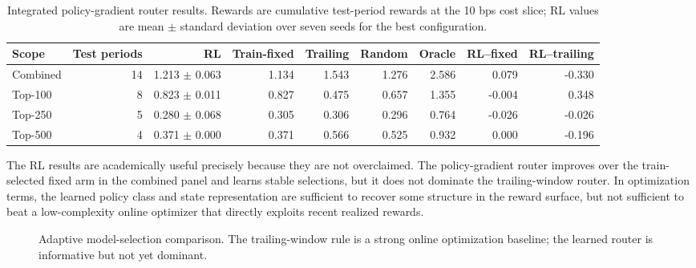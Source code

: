\documentclass[11pt,a4paper]{article}
\begin{document}
\begin{table}[H]
\centering
\caption{Integrated policy-gradient router results. Rewards are cumulative test-period rewards at the 10 bps cost slice; RL values are mean $\pm$ standard deviation over seven seeds for the best configuration.}
\label{tab:rl_math}
\scriptsize
\begin{tabular}{lrrrrrrrr}
\toprule
Scope & Test periods & RL & Train-fixed & Trailing & Random & Oracle & RL--fixed & RL--trailing\\
\midrule
Combined & 14 & 1.213 $\pm$ 0.063 & 1.134 & 1.543 & 1.276 & 2.586 & 0.079 & -0.330\\
Top-100 & 8 & 0.823 $\pm$ 0.011 & 0.827 & 0.475 & 0.657 & 1.355 & -0.004 & 0.348\\
Top-250 & 5 & 0.280 $\pm$ 0.068 & 0.305 & 0.306 & 0.296 & 0.764 & -0.026 & -0.026\\
Top-500 & 4 & 0.371 $\pm$ 0.000 & 0.371 & 0.566 & 0.525 & 0.932 & 0.000 & -0.196\\
\bottomrule
\end{tabular}
\end{table}
The RL results are academically useful precisely because they are not overclaimed. The policy-gradient router improves over the train-selected fixed arm in the combined panel and learns stable selections, but it does not dominate the trailing-window router. In optimization terms, the learned policy class and state representation are sufficient to recover some structure in the reward surface, but not sufficient to beat a low-complexity online optimizer that directly exploits recent realized rewards.

\begin{figure}[H]
\centering
{}
\caption{Adaptive model-selection comparison. The trailing-window rule is a strong online optimization baseline; the learned router is informative but not yet dominant.}
\label{fig:rl_math_bar}
\end{figure}
\end{document}
